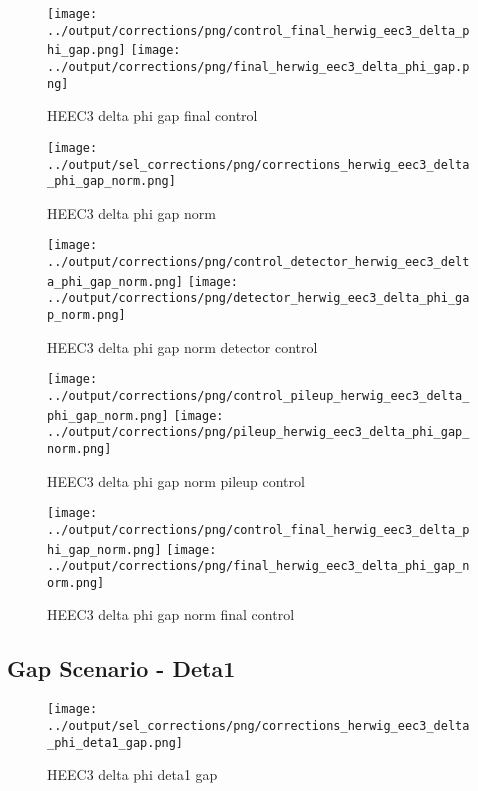 \documentclass[11pt]{book}
\begin{document}
\begin{figure}[ht]
\centering
\texttt{[image: ../output/corrections/png/control\_final\_herwig\_eec3\_delta\_phi\_gap.png]}
\texttt{[image: ../output/corrections/png/final\_herwig\_eec3\_delta\_phi\_gap.png]}
\caption{HEEC3 delta phi gap final control}
\label{fig:HEEC3_delta_phi_gap_final_control}
\end{figure}


\begin{figure}[ht]
\centering
\texttt{[image: ../output/sel\_corrections/png/corrections\_herwig\_eec3\_delta\_phi\_gap\_norm.png]}
\caption{HEEC3 delta phi gap norm}
\label{fig:HEEC3_delta_phi_gap_norm}
\end{figure}

\begin{figure}[ht]
\centering
\texttt{[image: ../output/corrections/png/control\_detector\_herwig\_eec3\_delta\_phi\_gap\_norm.png]}
\texttt{[image: ../output/corrections/png/detector\_herwig\_eec3\_delta\_phi\_gap\_norm.png]}
\caption{HEEC3 delta phi gap norm detector control}
\label{fig:HEEC3_delta_phi_gap_norm_detector_control}
\end{figure}

\begin{figure}[ht]
\centering
\texttt{[image: ../output/corrections/png/control\_pileup\_herwig\_eec3\_delta\_phi\_gap\_norm.png]}
\texttt{[image: ../output/corrections/png/pileup\_herwig\_eec3\_delta\_phi\_gap\_norm.png]}
\caption{HEEC3 delta phi gap norm pileup control}
\label{fig:HEEC3_delta_phi_gap_norm_pileup_control}
\end{figure}


\begin{figure}[ht]
\centering
\texttt{[image: ../output/corrections/png/control\_final\_herwig\_eec3\_delta\_phi\_gap\_norm.png]}
\texttt{[image: ../output/corrections/png/final\_herwig\_eec3\_delta\_phi\_gap\_norm.png]}
\caption{HEEC3 delta phi gap norm final control}
\label{fig:HEEC3_delta_phi_gap_norm_final_control}
\end{figure}

\clearpage
\subsection{Gap Scenario - Deta1}
\begin{figure}[ht]
\centering
\texttt{[image: ../output/sel\_corrections/png/corrections\_herwig\_eec3\_delta\_phi\_deta1\_gap.png]}
\caption{HEEC3 delta phi deta1 gap}
\label{fig:HEEC3_delta_phi_deta1_gap}
\end{figure}
\end{document}
